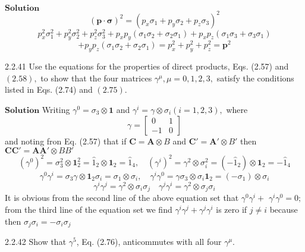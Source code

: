 \documentclass{styles/kaobook}
\begin{document}
$\boxed{\textbf{Solution}}$ 
$$(\mathbf{p} \cdot \boldsymbol{\sigma})^{2}=\left(p_{x} \sigma_{1}+p_{y} \sigma_{2}+p_{z} \sigma_{3}\right)^{2}$$
$$p_{x}^{2} \sigma_{1}^{2}+p_{y}^{2} \sigma_{2}^{2}+p_{z}^{2} \sigma_{3}^{2}+p_{x} p_{y}\left(\sigma_{1} \sigma_{2}+\sigma_{2} \sigma_{1}\right)+p_{x} p_{z}\left(\sigma_{1} \sigma_{3}+\sigma_{3} \sigma_{1}\right)$$
$$+p_{y} p_{z}\left(\sigma_{1} \sigma_{2}+\sigma_{2} \sigma_{1}\right)=p_{x}^{2}+p_{y}^{2}+p_{z}^{2}=\mathbf{p}^{2}$$



\begin{greenbox}{2.2.41}
Use the equations for the properties of direct products, Eqs. (2.57) and $(2.58),$ to show
that the four matrices $\gamma^{\mu}, \mu=0,1,2,3,$ satisfy the conditions listed in Eqs. (2.74) and $(2.75) .$
\end{greenbox}


$\boxed{\textbf{Solution}}$  Writing $\gamma^{0}=\sigma_{3} \otimes \mathbf{1}$ and $\gamma^{i}=\gamma \otimes \sigma_{i}(i=1,2,3),$ where
$$
\gamma=\begin{bmatrix}{0} & {1} \\ {-1} & {0}\end{bmatrix}
$$
and noting fron Eq. (2.57) that if $\mathbf{C}=\mathbf{A} \otimes B$ and $\mathbf{C}'=\mathbf{A}' \otimes B'$ then
$\mathbf{C} \mathbf{C}'=\mathbf{A} \mathbf{A}' \otimes B B'$
$$\left(\gamma^{0}\right)^{2}=\sigma_{3}^{2} \otimes \mathbf{1}_{2}^{2}=\hat{1}_{2} \otimes \mathbf{1}_{2}=\hat{1}_{4}, \quad\left(\gamma^{i}\right)^{2}=\gamma^{2} \otimes \sigma_{i}^{2}=\left(-\hat{1}_{2}\right) \otimes \mathbf{1}_{2}=-\hat{1}_{4}$$
$$\gamma^{0} \gamma^{i}=\sigma_{3} \gamma \otimes \mathbf{1}_{2} \sigma_{i}=\sigma_{1} \otimes \sigma_{i}, \quad \gamma^{i} \gamma^{0}=\gamma \sigma_{3} \otimes \sigma_{i} \mathbf{1}_{2}=\left(-\sigma_{1}\right) \otimes \sigma_{i}$$
$$\gamma^{i} \gamma^{j}=\gamma^{2} \otimes \sigma_{i} \sigma_{j} \quad \gamma^{j} \gamma^{i}=\gamma^{2} \otimes \sigma_{j} \sigma_{i}$$
It is obvious from the second line of the above equation set that $\gamma^{0} \gamma^{i}+$
$\gamma^{i} \gamma^{0}=0 ;$ from the third line of the equation set we find $\gamma^{i} \gamma^{j}+\gamma^{j} \gamma^{i}$ is zero if $j \neq i$ because then $\sigma_{j} \sigma_{i}=-\sigma_{i} \sigma_{j}$

\begin{greenbox}{2.2.42}
Show that $\gamma^{5}$, Eq. (2.76), anticommutes with all four $\gamma^{\mu}$.
\end{greenbox}
\end{document}
